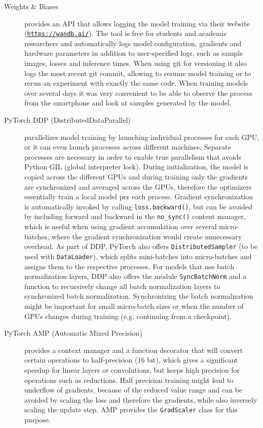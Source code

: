 \begin{description}
    \item[Weights \& Biases] provides an API that allows logging the model training via their website (\hyperlink{https://wandb.ai/}{\texttt{https://wandb.ai/}}). The tool is free for students and academic researchers and automatically logs model configuration, gradients and hardware parameters in addition to user-specified logs, such as sample images, losses and inference times. When using git for versioning it also logs the most recent git commit, allowing to resume model training or to rerun an experiment with exactly the same code. When training models over several days it was very convenient to be able to observe the process from the smartphone and look at samples generated by the model.~\autocite{wandb}
    \item[PyTorch DDP (DistributedDataParallel)] parallelizes model training by launching individual processes for each GPU, or it can even launch processes across different machines. Separate processes are necessary in order to enable true parallelism that avoids Python GIL (global interpreter lock). During initialization, the model is copied across the different GPUs and during training only the gradients are synchronized and averaged across the GPUs, therefore the optimizers essentially train a local model per each process. Gradient synchronization is automatically invoked by calling \texttt{loss.backward()}, but can be avoided by including forward and backward in the \texttt{no\_sync()} content manager, which is useful when using gradient accumulation over several micro-batches, where the gradient synchronization would create unnecessary overhead. As part of DDP, PyTorch also offers \texttt{DistributedSampler} (to be used with \lstinline{DataLoader}), which splits mini-batches into micro-batches and assigns them to the respective processes. For models that use batch normalization layers, DDP also offers the module \texttt{SyncBatchNorm} and a function to recursively change all batch normalization layers to synchronized batch normalization. Synchronizing the batch normalization might be important for small micro-batch sizes or when the number of GPUs changes during training (e.g. continuing from a checkpoint).
    \item[PyTorch AMP (Automatic Mixed Precision)] provides a context manager and a function decorator that will convert certain operations to half-precision (16 bit), which gives a significant speedup for linear layers or convolutions, but keeps high precision for operations such as reductions. Half precision training might lead to underflow of gradients, because of the reduced value range and can be avoided by scaling the loss and therefore the gradients, while also inversely scaling the update step. AMP provides the \texttt{GradScaler} class for this purpose.
\end{description}